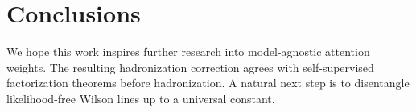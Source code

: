 \section{Conclusions}\label{sec:conclusions}

We hope this work inspires further research into model-agnostic
attention weights. The resulting hadronization correction agrees with
self-supervised factorization theorems before hadronization. A natural
next step is to disentangle likelihood-free Wilson lines up to a
universal constant.

